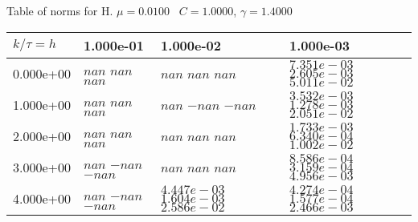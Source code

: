 \begin{center}
Table of norms for H. $\mu = 0.0100$ \, $C = 1.0000$, $\gamma = 1.4000$
  
\begin{tabular}{|p{1in}|p{1in}|p{1in}|p{1in}|} \hline
$k / \tau = h$ &1.000e-01 &1.000e-02 &1.000e-03 \\ \hline 
0.000e+00 & $nan$  $nan$  $nan$  & $nan$  $nan$  $nan$  & $7.351e-03$  $2.605e-03$  $5.011e-02$  \\ \hline 
1.000e+00 & $nan$  $nan$  $nan$  & $nan$  $-nan$  $-nan$  & $3.532e-03$  $1.278e-03$  $2.051e-02$  \\ \hline 
2.000e+00 & $nan$  $nan$  $nan$  & $nan$  $nan$  $nan$  & $1.733e-03$  $6.340e-04$  $1.002e-02$  \\ \hline 
3.000e+00 & $nan$  $-nan$  $-nan$  & $nan$  $nan$  $nan$  & $8.586e-04$  $3.159e-04$  $4.956e-03$  \\ \hline 
4.000e+00 & $nan$  $-nan$  $-nan$  & $4.447e-03$  $1.604e-03$  $2.586e-02$  & $4.274e-04$  $1.577e-04$  $2.466e-03$  \\ \hline 

\end{tabular}\\[20pt]
\end{center}
